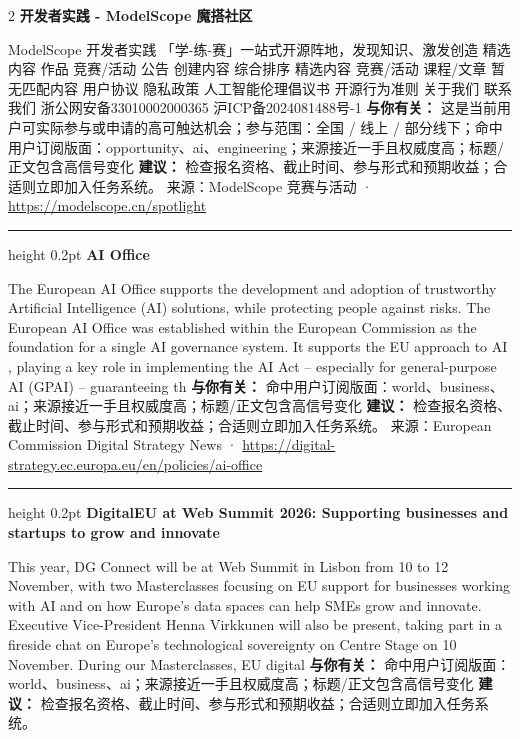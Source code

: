 \documentclass[10.5pt]{ctexart}
\begin{document}
\begin{multicols}{2}
{\large\bfseries 开发者实践 - ModelScope 魔搭社区}\par
ModelScope 开发者实践 「学-练-赛」一站式开源阵地，发现知识、激发创造 精选内容 作品 竞赛/活动 公告 创建内容 综合排序 精选内容 竞赛/活动 课程/文章 暂无匹配内容 用户协议 隐私政策 人工智能伦理倡议书 开源行为准则 关于我们 联系我们 浙公网安备33010002000365 沪ICP备2024081488号-1
\textbf{与你有关：} 这是当前用户可实际参与或申请的高可触达机会；参与范围：全国 / 线上 / 部分线下；命中用户订阅版面：opportunity、ai、engineering；来源接近一手且权威度高；标题/正文包含高信号变化
\textbf{建议：} 检查报名资格、截止时间、参与形式和预期收益；合适则立即加入任务系统。
{\footnotesize\color{ormuted} 来源：ModelScope 竞赛与活动 · \url{https://modelscope.cn/spotlight}}
\vspace{2mm}
\hrule height 0.2pt
\vspace{2mm}
{\large\bfseries AI Office}\par
The European AI Office supports the development and adoption of trustworthy Artificial Intelligence (AI) solutions, while protecting people against risks. The European AI Office was established within the European Commission as the foundation for a single AI governance system. It supports the EU approach to AI , playing a key role in implementing the AI Act – especially for general-purpose AI (GPAI) – guaranteeing th
\textbf{与你有关：} 命中用户订阅版面：world、business、ai；来源接近一手且权威度高；标题/正文包含高信号变化
\textbf{建议：} 检查报名资格、截止时间、参与形式和预期收益；合适则立即加入任务系统。
{\footnotesize\color{ormuted} 来源：European Commission Digital Strategy News · \url{https://digital-strategy.ec.europa.eu/en/policies/ai-office}}
\vspace{2mm}
\hrule height 0.2pt
\vspace{2mm}
{\large\bfseries DigitalEU at Web Summit 2026: Supporting businesses and startups to grow and innovate}\par
This year, DG Connect will be at Web Summit in Lisbon from 10 to 12 November, with two Masterclasses focusing on EU support for businesses working with AI and on how Europe’s data spaces can help SMEs grow and innovate. Executive Vice-President Henna Virkkunen will also be present, taking part in a fireside chat on Europe’s technological sovereignty on Centre Stage on 10 November. During our Masterclasses, EU digital
\textbf{与你有关：} 命中用户订阅版面：world、business、ai；来源接近一手且权威度高；标题/正文包含高信号变化
\textbf{建议：} 检查报名资格、截止时间、参与形式和预期收益；合适则立即加入任务系统。

\end{multicols}
\end{document}
